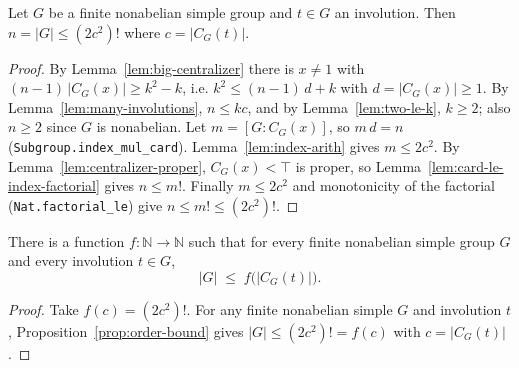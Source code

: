 \begin{proposition}
    \label{prop:order-bound}
    \leanok
    Let $G$ be a finite nonabelian simple group and $t \in G$ an involution.
    Then $n = |G| \le (2 c^2)!$ where $c = |C_G(t)|$.
\end{proposition}
\begin{proof}
    By Lemma~\ref{lem:big-centralizer} there is $x \ne 1$ with
    $(n-1)\,|C_G(x)| \ge k^2 - k$, i.e. $k^2 \le (n-1)\,d + k$ with
    $d = |C_G(x)| \ge 1$. By Lemma~\ref{lem:many-involutions}, $n \le k c$, and by
    Lemma~\ref{lem:two-le-k}, $k \ge 2$; also $n \ge 2$ since $G$ is nonabelian.
    Let $m = [G : C_G(x)]$, so $m\, d = n$ (\texttt{Subgroup.index\_mul\_card}).
    Lemma~\ref{lem:index-arith} gives $m \le 2 c^2$. By
    Lemma~\ref{lem:centralizer-proper}, $C_G(x) < \top$ is proper, so
    Lemma~\ref{lem:card-le-index-factorial} gives $n \le m!$. Finally
    $m \le 2 c^2$ and monotonicity of the factorial
    (\texttt{Nat.factorial\_le}) give $n \le m! \le (2 c^2)!$.
\end{proof}

\begin{theorem}
    \label{thm:brauer-fowler}
    \leanok
    There is a function $f : \mathbb{N} \to \mathbb{N}$ such that for every finite
    nonabelian simple group $G$ and every involution $t \in G$,
    \[
        |G| \;\le\; f\bigl(|C_G(t)|\bigr).
    \]
\end{theorem}
\begin{proof}
    Take $f(c) = (2 c^2)!$. For any finite nonabelian simple $G$ and involution
    $t$, Proposition~\ref{prop:order-bound} gives
    $|G| \le (2 c^2)! = f(c)$ with $c = |C_G(t)|$.
\end{proof}


